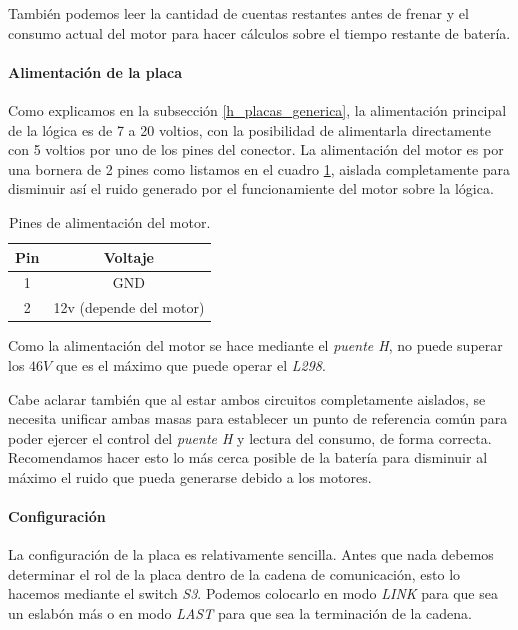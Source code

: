 Tambi\'en podemos leer la cantidad de cuentas restantes antes de frenar y el consumo actual del motor para
hacer c\'alculos sobre el tiempo restante de bater\'ia.

\paragraph{Alimentaci\'on de la placa}
\label{h_placas_motorDC_alimentacion}

Como explicamos en la subsecci\'on \ref{h_placas_generica}, la alimentaci\'on principal de la l\'ogica es
de 7 a 20 voltios, con la posibilidad de alimentarla directamente con 5 voltios por uno de los pines del conector.
La alimentaci\'on del motor es por una bornera de 2 pines como listamos en el cuadro \ref{hT_placa_dc_alimentacion},
aislada completamente para disminuir as\'i el ruido generado por el funcionamiente del motor sobre la l\'ogica.

\begin{table}
	\begin{center}
		\begin{tabular}{|c|c|}
			\hline
			Pin & Voltaje \\
			\hline
			1 & GND \\
			\hline
			2 & 12v (depende del motor) \\
			\hline
		\end{tabular}
		\caption{Pines de alimentaci\'on del motor.}
		\label{hT_placa_dc_alimentacion}
	\end{center}
\end{table}

Como la alimentaci\'on del motor se hace mediante el \emph{puente H}, no puede superar los $46V$ que es el
m\'aximo que puede operar el \emph{L298}.

Cabe aclarar tambi\'en que al estar ambos circuitos completamente aislados, se necesita unificar ambas masas
para establecer un punto de referencia com\'un para poder ejercer el control del \emph{puente H} y lectura
del consumo, de forma correcta.
Recomendamos hacer esto lo m\'as cerca posible de la bater\'ia para disminuir al m\'aximo el ruido que pueda
generarse debido a los motores.

\paragraph{Configuraci\'on}
\label{h_placas_motorDC_config}

La configuraci\'on de la placa es relativamente sencilla.
Antes que nada debemos determinar el rol de la placa dentro de la cadena de comunicaci\'on, esto lo hacemos
mediante el switch \emph{S3}.
Podemos colocarlo en modo \emph{LINK} para que sea un eslab\'on m\'as o en modo \emph{LAST} para que sea
la terminaci\'on de la cadena.

